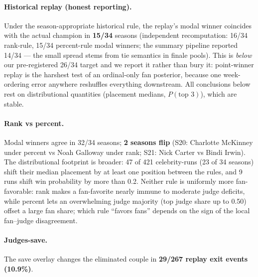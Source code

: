 \paragraph{Historical replay (honest reporting).} Under the season-appropriate
historical rule, the replay's modal winner coincides with the actual champion in
\textbf{15/34} seasons (independent recomputation: 16/34 rank-rule, 15/34
percent-rule modal winners; the summary pipeline reported 14/34 --- the small
spread stems from tie semantics in finale pools). This is \emph{below} our
pre-registered 26/34 target and we report it rather than bury it: point-winner
replay is the harshest test of an ordinal-only fan posterior, because one
week-ordering error anywhere reshuffles everything downstream. All conclusions
below rest on distributional quantities (placement medians, $P(\text{top 3})$),
which are stable.

\paragraph{Rank vs percent.} Modal winners agree in 32/34 seasons; \textbf{2
seasons flip} (S20: Charlotte McKinney under percent vs Noah Galloway under rank;
S21: Nick Carter vs Bindi Irwin). The distributional footprint is broader: 47 of
421 celebrity-runs (23 of 34 seasons) shift their median placement by at least one
position between the rules, and 9 runs shift win probability by more than 0.2.
Neither rule is uniformly more fan-favorable: rank makes a fan-favorite nearly
immune to moderate judge deficits, while percent lets an overwhelming judge
majority (top judge share up to 0.50) offset a large fan share; which rule
``favors fans'' depends on the sign of the local fan--judge disagreement.

\paragraph{Judges-save.} The save overlay changes the eliminated couple in
\textbf{29/267 replay exit events (10.9\%)}.

